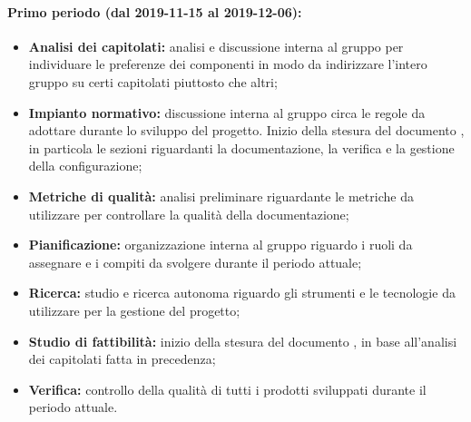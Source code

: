 			\paragraph{Primo periodo (dal 2019-11-15 al 2019-12-06):}
				\begin{itemize}
					\item \textbf{Analisi dei capitolati:} analisi e discussione interna al gruppo per individuare le preferenze dei componenti in modo da indirizzare l'intero gruppo su certi capitolati piuttosto che altri;
					\item \textbf{Impianto normativo:} discussione interna al gruppo circa le regole da adottare durante lo sviluppo del progetto. Inizio della stesura del documento , in particola le sezioni riguardanti la documentazione, la verifica e la gestione della configurazione;
					\item \textbf{Metriche di qualità:} analisi preliminare riguardante le metriche da utilizzare per controllare la qualità della documentazione;
					\item \textbf{Pianificazione:} organizzazione interna al gruppo riguardo i ruoli da assegnare e i compiti da svolgere durante il periodo attuale;
					\item \textbf{Ricerca:} studio e ricerca autonoma riguardo gli strumenti e le tecnologie da utilizzare per la gestione del progetto;
					\item \textbf{Studio di fattibilità:} inizio della stesura del documento , in base all'analisi dei capitolati fatta in precedenza;
					\item \textbf{Verifica:} controllo della qualità di tutti i prodotti sviluppati durante il periodo attuale.
				\end{itemize}
